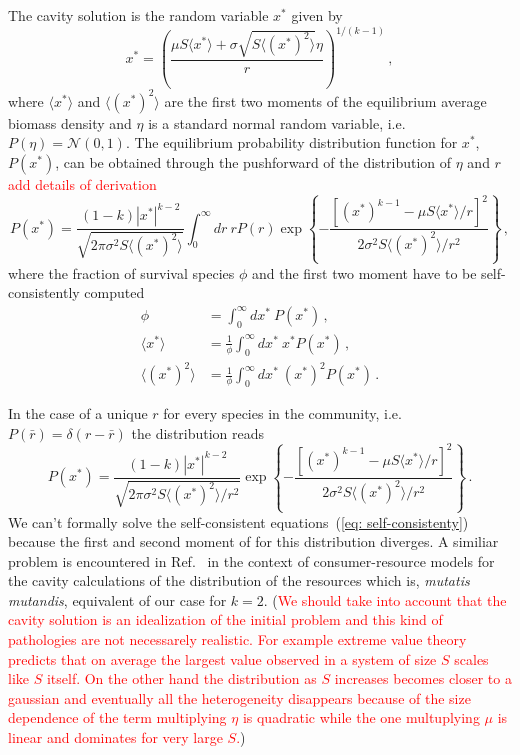 \documentclass[10pt]{article}
\begin{document}
The cavity solution is the random variable $x^*$ given by
\begin{equation}
    x^* = \left(\frac{\mu S \langle x^* \rangle + \sigma \sqrt{S\langle (x^*)^2\rangle} \eta}
    {r}\right)^{1/(k-1)} \, ,
    \label{eq: cavity solution}
\end{equation}
where $\langle x^*\rangle$ and $\langle (x^*)^2\rangle$ are 
the first two moments of the equilibrium average biomass density
and $\eta$ is a standard normal random variable, i.e. $P(\eta)=\mathcal N (0,1)$.
The equilibrium probability distribution function for $x^*$, $P(x^*)$,
can be obtained through the pushforward of the distribution of $\eta$ and $r$
\textcolor{red}{add details of derivation}
\begin{equation}
    P(x^*)=\frac{(1-k)|x^*|^{k-2}}{\sqrt{2\pi \sigma^2 S\langle (x^*)^2 \rangle}}
    \int_0^{\infty}dr \ r P(r)
    \exp{\left\{-\frac{\left[(x^*)^{k-1}-\mu S\langle x^*\rangle/r\right]^2}{2\sigma^2S\langle (x^*)^2 \rangle/r^2}\right\}} \, ,
\end{equation}
where the fraction of survival species $\phi$ and the first two moment
have to be self-consistently computed
\begin{align}
    \phi&= \int_0^{\infty}dx^* \ P(x^*)\, , \nonumber \\
    \langle x^*\rangle&=\frac{1}{\phi}\int_0^{\infty}dx^* \ x^*P(x^*) \, , \label{eq: self-consistenty}\\
    \langle (x^*)^2\rangle&=\frac{1}{\phi}\int_0^{\infty}dx^* \ (x^*)^2 P(x^*) \, . \nonumber
\end{align}

In the case of a unique $r$ for every species in the community, i.e. $P(\bar{r})=\delta(r-\bar{r})$
the distribution reads
\begin{equation}
    P(x^*)=\frac{(1-k)|x^*|^{k-2}}{\sqrt{2\pi \sigma^2 S\langle (x^*)^2 \rangle/r^2}}
    \exp{\left\{-\frac{\left[(x^*)^{k-1}-\mu S\langle x^*\rangle/r\right]^2}{2\sigma^2S\langle (x^*)^2 \rangle/r^2}\right\}} \, .
    \label{eq: species dist unique r}
\end{equation}
We can't formally solve the self-consistent equations~(\ref{eq: self-consistenty})
because the first and second moment of  for this distribution diverges.
A similiar problem is encountered in Ref.~\cite{Cui2020}
in the context of consumer-resource models for the cavity calculations of
the distribution of the resources which is, \textit{mutatis mutandis}, 
equivalent of our case for $k=2$. (\textcolor{red}{We should take into account that
the cavity solution is an idealization of the initial problem and 
this kind of pathologies are not necessarely realistic.
For example extreme value theory~\cite{Majumdar2020} predicts that on average the largest
value observed in a system of
size $S$ scales like $S$ itself. On the other hand the distribution as $S$ increases
becomes closer to a gaussian and eventually all the heterogeneity disappears
because of the size dependence of the term multiplying $\eta$ is quadratic while the
one multuplying $\mu$ is linear and dominates for very large $S$.})
\end{document}
